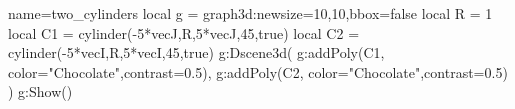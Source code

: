\documentclass[12pt]{standalone}
\begin{document}
\begin{luadraw}{name=two_cylinders}
local g = graph3d:new{size={10,10},bbox=false}
local R = 1
local C1 = cylinder(-5*vecJ,R,5*vecJ,45,true)
local C2 = cylinder(-5*vecI,R,5*vecI,45,true)
g:Dscene3d(
    g:addPoly(C1, {color="Chocolate",contrast=0.5}),
    g:addPoly(C2, {color="Chocolate",contrast=0.5}) )
g:Show()
\end{luadraw} 
\end{document}
